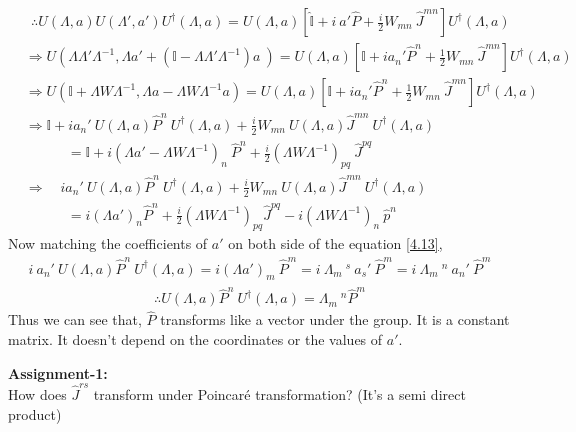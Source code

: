 \documentclass[14pt]{article} %
\begin{document}
\begin{align*}
&~~\therefore U(\Lambda, a) U(\Lambda', a') U^\dagger(\Lambda, a) = U(\Lambda, a) \left[ \hat{\mathbb{I}} + i~a'\hat{P} + \frac{i}{2} W_{mn} ~\hat{J}^{mn} \right] U^\dagger(\Lambda, a) \\
&\Rightarrow U\left(\Lambda \Lambda'\Lambda^{-1}, \Lambda a' + (\mathbb{I} - \Lambda \Lambda'\Lambda^{-1})a~ \right) = U(\Lambda, a)\left[\mathbb{I} + i a_n' \hat{P}^n + \frac{1}{2} W_{mn}~ \hat{J}^{mn}\right] U^\dagger(\Lambda, a) \\
&\Rightarrow U(\mathbb{I} + \Lambda W \Lambda^{-1}, \Lambda a - \Lambda W \Lambda^{-1}a) = U(\Lambda, a)\left[\mathbb{I} + i a_n' \hat{P}^n + \frac{1}{2} W_{mn}~ \hat{J}^{mn}\right] U^\dagger(\Lambda, a) \\
&\Rightarrow \mathbb{I} + i a_n' ~U(\Lambda, a) \hat{P}^n~ U^\dagger(\Lambda, a) + \frac{i}{2} W_{mn}~ U(\Lambda, a) \hat{J}^{mn}~U^\dagger(\Lambda, a) \\
& \quad \quad \quad= \mathbb{I} + i (\Lambda a'-\Lambda W \Lambda^{-1})_n ~\hat{P}^n + \frac{i}{2} (\Lambda W \Lambda^{-1})_{pq}~ \hat{J}^{pq} \tag{4.12}  \label{4.12}\\
&\Rightarrow\quad i a_n'~ U(\Lambda, a) \hat{P}^n~ U^\dagger(\Lambda, a) + \frac{i}{2} W_{mn} ~U(\Lambda, a) \hat{J}^{mn}~ U^\dagger(\Lambda, a) \\
& \quad \quad \quad= i {(\Lambda a')}_n \hat{P}^n + \frac{i}{2} {(\Lambda W \Lambda^{-1})}_{pq} \hat{J}^{pq} -i(\Lambda W \Lambda^{-1})_n~\hat{p}^n \tag{4.13}  \label{4.13}
\end{align*}
Now  matching the coefficients of $a'$ on both side of the equation \eqref{4.13},
\begin{align*}
i ~a_n' ~U(\Lambda,a) \hat{P}^n ~U^\dagger(\Lambda, a) = i{(\Lambda a')}_m~\hat{P}^m = i~ \Lambda_m~^s~a_s'~\hat{P}^m = i~\Lambda_m~^n~a_n'~\hat{P}^m 
\end{align*}
\begin{align*}
\boxed{\therefore U(\Lambda, a) \hat{P}^n~ U^\dagger(\Lambda, a) = \Lambda_m~^n\hat{P}^m}
\end{align*}
Thus we can see that, $\hat{P}$ transforms like a vector under the group. It is a constant matrix. It doesn't depend on the coordinates or the values of $a'$.
\begin{framed}
\noindent \textbf{Assignment-1:}\\
\noindent How does $\hat{J}^{rs}$ transform under Poincaré transformation? (It's a semi direct product)
\end{framed}
\end{document}
